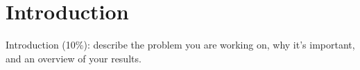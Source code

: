 \section{Introduction}
Introduction (10\%): describe the problem you are working on, why it's important, and an overview of your results.

